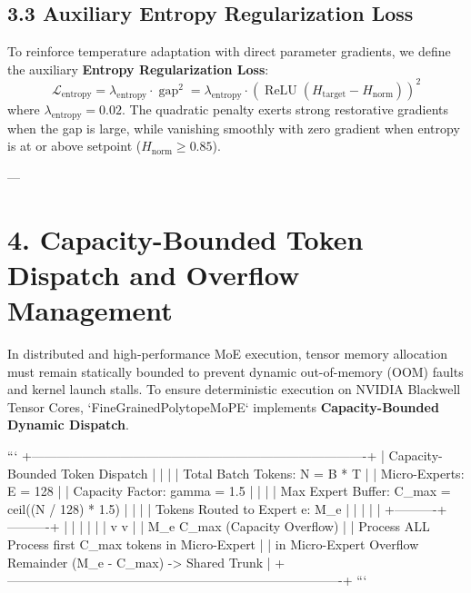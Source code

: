 \documentclass[11pt,twoside,openright]{amsbook}
\begin{document}
{{{{{{{{{{\subsection{3.3 Auxiliary Entropy Regularization Loss}

To reinforce temperature adaptation with direct parameter gradients, we define the auxiliary \textbf{Entropy Regularization Loss}:
$$\mathcal{L}_{\text{entropy}} = \lambda_{\text{entropy}} \cdot \operatorname{gap}^2 = \lambda_{\text{entropy}} \cdot \left( \operatorname{ReLU}(H_{\text{target}} - H_{\text{norm}}) \right)^2$$
where $\lambda_{\text{entropy}} = 0.02$.
The quadratic penalty exerts strong restorative gradients when the gap is large, while vanishing smoothly with zero gradient when entropy is at or above setpoint ($H_{\text{norm}} \ge 0.85$).

---

\section{4. Capacity-Bounded Token Dispatch and Overflow Management}

In distributed and high-performance MoE execution, tensor memory allocation must remain statically bounded to prevent dynamic out-of-memory (OOM) faults and kernel launch stalls.
To ensure deterministic execution on NVIDIA Blackwell Tensor Cores, `FineGrainedPolytopeMoPE` implements \textbf{Capacity-Bounded Dynamic Dispatch}.

```
+-------------------------------------------------------------------------------+
|                       Capacity-Bounded Token Dispatch                         |
|                                                                               |
|  Total Batch Tokens: N = B * T                                                |
|  Micro-Experts: E = 128                                                       |
|  Capacity Factor: gamma = 1.5                                                 |
|                                                                               |
|  Max Expert Buffer: C_max = ceil((N / 128) * 1.5)                             |
|                                                                               |
|           Tokens Routed to Expert e: M_e                                      |
|                       |                                                       |
|            +----------+----------+                                            |
|            |                     |                                            |
|            v                     v                                            |
|      M_e  C_max (Capacity Overflow)                   |
|      Process ALL            Process first C_max tokens in Micro-Expert        |
|      in Micro-Expert        Overflow Remainder (M_e - C_max) -> Shared Trunk  |
+-------------------------------------------------------------------------------+
```

}}}}}}}}}}
\end{document}
